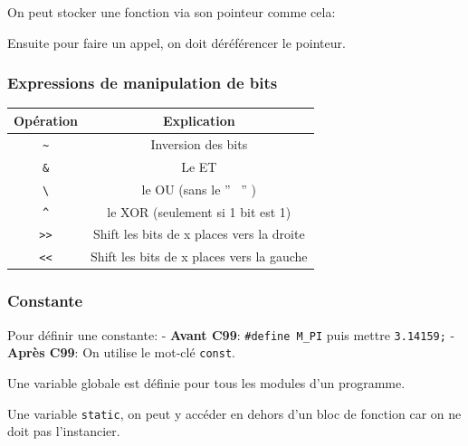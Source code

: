 On peut stocker une fonction via son pointeur comme cela:

\begin{Shaded}
\begin{Highlighting}[]
\OperatorTok{(*}\OperatorTok{)([}\OperatorTok{]+);}
 \OperatorTok{(*}\OperatorTok{)(}\OperatorTok{,} \OperatorTok{,} \OperatorTok{*);}
 \OperatorTok{(*}\OperatorTok{)(}\OperatorTok{);}
\OperatorTok{=} \OperatorTok{\&}\OperatorTok{;}
\end{Highlighting}
\end{Shaded}

Ensuite pour faire un appel, on doit déréférencer le pointeur.

\subsubsection{Expressions de manipulation de
bits}\label{expressions-de-manipulation-de-bits}

\begin{longtable}[]{@{}cc@{}}
\toprule\noalign{}
Opération & Explication \\
\midrule\noalign{}
\endhead
\bottomrule\noalign{}
\endlastfoot
\texttt{\textasciitilde{}} & Inversion des bits \\
\texttt{\&} & Le ET \\
\texttt{\textbackslash{}\textbar{}} & le OU (sans le '' ~'' ) \\
\texttt{\^{}} & le XOR (seulement si 1 bit est 1) \\
\texttt{\textgreater{}\textgreater{}} & Shift les bits de x places vers
la droite \\
\texttt{\textless{}\textless{}} & Shift les bits de x places vers la
gauche \\
\end{longtable}

\subsubsection{Constante}\label{constante}

Pour définir une constante: - \textbf{Avant C99}:
\texttt{\#define\ M\_PI} puis mettre \texttt{3.14159;} - \textbf{Après
C99}: On utilise le mot-clé \texttt{const}.

Une variable globale est définie pour tous les modules d'un programme.

Une variable \texttt{static}, on peut y accéder en dehors d'un bloc de
fonction car on ne doit pas l'instancier.
